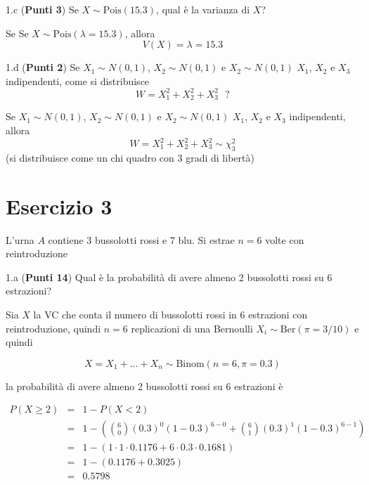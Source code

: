 \documentclass[
  11pt,
]{book}
\theoremstyle{mytheoremstyle}
\theoremstyle{mydefstyle}
\newenvironment{sol}
  {
  \begin{tcolorbox}[enhanced,breakable,arc=0.1mm,boxrule=1pt,colback=white,colframe=iblue,
  title=\bf \fontfamily{lmss}\selectfont \hspace{.5 cm} Soluzione,drop fuzzy shadow]

}{
\end{tcolorbox}
  }
\begin{document}
1.c (\textbf{Punti 3}) Se \(X\sim\text{Pois}(15.3)\), qual è la varianza di \(X\)?

\begin{sol}
Se Se \(X\sim\text{Pois}(\lambda=15.3)\), allora
\[V(X)=\lambda=15.3\]

\end{sol}

1.d (\textbf{Punti 2}) Se \(X_1\sim N(0,1)\), \(X_2\sim N(0,1)\) e \(X_2\sim N(0,1)\)
\(X_1\), \(X_2\) e \(X_3\) indipendenti, come si distribuisce
\[W=X_1^2+X_2^2+X_3^2 ~~~?\]

\begin{sol}
Se \(X_1\sim N(0,1)\), \(X_2\sim N(0,1)\) e \(X_2\sim N(0,1)\)
\(X_1\), \(X_2\) e \(X_3\) indipendenti, allora\\
\[W=X_1^2+X_2^2+X_3^2\sim \chi_3^2\]
(si distribuisce come un chi quadro con 3 gradi di libertà)

\end{sol}

\section{Esercizio 3}\label{esercizio-3}

L'urna \(A\) contiene 3 bussolotti rossi e 7 blu. Si estrae \(n=6\) volte con reintroduzione

1.a (\textbf{Punti 14}) Qual è la probabilità di avere almeno 2 bussolotti rossi su 6 estrazioni?

\begin{sol}
Sia \(X\) la VC che conta il numero di bussolotti rossi in 6 estrazioni con reintroduzione,
quindi \(n=6\) replicazioni di una Bernoulli \(X_i\sim\mbox{Ber}(\pi=3/10)\) e quindi

\[
X=X_1+...+X_n\sim\mbox{Binom}(n=6,\pi=0.3)
\]

la probabilità di avere almeno 2 bussolotti rossi su 6 estrazioni è

\begin{eqnarray*}
P(X\ge 2)&=& 1- P(X<2)\\
&=&1-\left(\binom{6}{0}\left(0.3\right)^0 \left(1-0.3\right)^{6-0}+\binom{6}{1}\left(0.3\right)^1 \left(1-0.3\right)^{6-1}\right)\\
&=&1-\left(1\cdot 1 \cdot 0.1176+6\cdot0.3\cdot 0.1681\right)\\
&=&1-(0.1176+0.3025)\\
&=&0.5798
\end{eqnarray*}

\end{sol}
\end{document}
